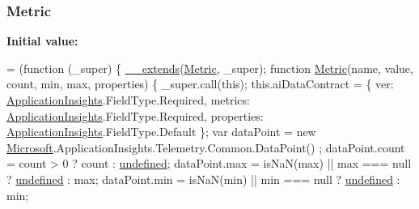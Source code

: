 \subsubsection[{\texorpdfstring{Metric}{Metric}}]{ Metric}\hypertarget{obj_2_release_2_package_2_package_tmp_2_scripts_2ai_80_822_89-build00167_8js_ac489226418fc3fc53d1daf8e6636b97d}{}\label{obj_2_release_2_package_2_package_tmp_2_scripts_2ai_80_822_89-build00167_8js_ac489226418fc3fc53d1daf8e6636b97d}
{\bfseries Initial value\+:}
\begin{DoxyCode}
= (\textcolor{keyword}{function} (\_super) \{
                \hyperlink{obj_2_release_2_package_2_package_tmp_2_scripts_2ai_80_822_89-build00167_8js_ac09f4951ac4b25df0272d4e78ff85ae0}{\_\_extends}(\hyperlink{obj_2_release_2_package_2_package_tmp_2_scripts_2ai_80_822_89-build00167_8js_ac489226418fc3fc53d1daf8e6636b97d}{Metric}, \_super);
                \textcolor{keyword}{function} \hyperlink{obj_2_release_2_package_2_package_tmp_2_scripts_2ai_80_822_89-build00167_8js_ac489226418fc3fc53d1daf8e6636b97d}{Metric}(name, value, count, min, max, properties) \{
                    \_super.call(\textcolor{keyword}{this});
                    this.aiDataContract = \{
                        ver: \hyperlink{obj_2_release_2_package_2_package_tmp_2_scripts_2ai_80_822_89-build00167_8js_aa415ef4f8cdd699689ef4b61db7656d8}{ApplicationInsights}.FieldType.Required,
                        metrics: \hyperlink{obj_2_release_2_package_2_package_tmp_2_scripts_2ai_80_822_89-build00167_8js_aa415ef4f8cdd699689ef4b61db7656d8}{ApplicationInsights}.FieldType.Required,
                        properties: \hyperlink{obj_2_release_2_package_2_package_tmp_2_scripts_2ai_80_822_89-build00167_8js_aa415ef4f8cdd699689ef4b61db7656d8}{ApplicationInsights}.FieldType.Default
                    \};
                    var dataPoint = \textcolor{keyword}{new} \hyperlink{obj_2_release_2_package_2_package_tmp_2_scripts_2ai_80_822_89-build00167_8js_af7b21097393c8dc2ece8949358ff0e27}{Microsoft}.ApplicationInsights.Telemetry.Common.DataPoint()
      ;
                    dataPoint.count = count > 0 ? count : \hyperlink{obj_2_release_2_package_2_package_tmp_2_scripts_2jquery-1_810_82_8js_a08113a236cc18d2a9d5ce27e638012be}{undefined};
                    dataPoint.max = isNaN(max) || max === null ? \hyperlink{obj_2_release_2_package_2_package_tmp_2_scripts_2jquery-1_810_82_8js_a08113a236cc18d2a9d5ce27e638012be}{undefined} : max;
                    dataPoint.min = isNaN(min) || min === null ? \hyperlink{obj_2_release_2_package_2_package_tmp_2_scripts_2jquery-1_810_82_8js_a08113a236cc18d2a9d5ce27e638012be}{undefined} : min;

\end{DoxyCode}
